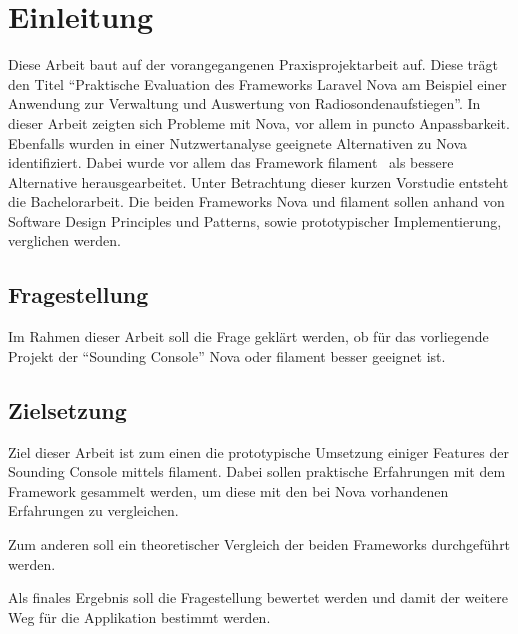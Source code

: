 \section{Einleitung}

Diese Arbeit baut auf der vorangegangenen Praxisprojektarbeit auf.
Diese trägt den Titel \enquote{Praktische Evaluation des Frameworks Laravel Nova am Beispiel einer Anwendung zur Verwaltung und Auswertung von Radiosondenaufstiegen}.
In dieser Arbeit zeigten sich Probleme mit Nova, vor allem in puncto Anpassbarkeit.
Ebenfalls wurden in einer Nutzwertanalyse geeignete Alternativen zu Nova identifiziert.
Dabei wurde vor allem das Framework filament~\cite{filament} als bessere Alternative herausgearbeitet.
Unter Betrachtung dieser kurzen Vorstudie entsteht die Bachelorarbeit.
Die beiden Frameworks Nova und filament sollen anhand von Software Design Principles und Patterns, sowie prototypischer Implementierung, verglichen werden.

\subsection{Fragestellung}
Im Rahmen dieser Arbeit soll die Frage geklärt werden, ob für das vorliegende Projekt der \enquote{Sounding Console} Nova oder filament besser geeignet ist.

\subsection{Zielsetzung}
Ziel dieser Arbeit ist zum einen die prototypische Umsetzung einiger Features der Sounding Console mittels filament.
Dabei sollen praktische Erfahrungen mit dem Framework gesammelt werden, um diese mit den bei Nova vorhandenen Erfahrungen zu vergleichen.

Zum anderen soll ein theoretischer Vergleich der beiden Frameworks durchgeführt werden.

Als finales Ergebnis soll die Fragestellung bewertet werden und damit der weitere Weg für die Applikation bestimmt werden.
